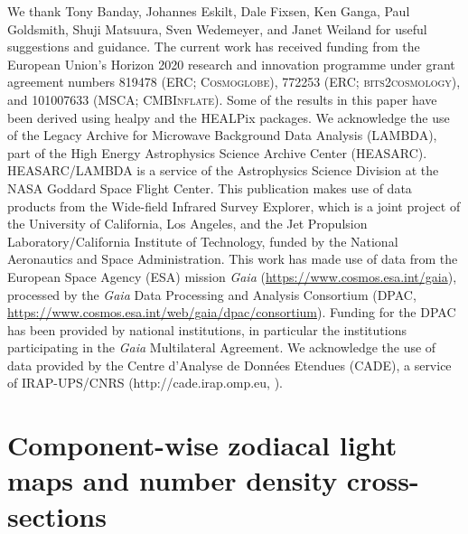 \documentclass[twocolumn]{aa}
\begin{document}
\begin{acknowledgements}
  We thank Tony Banday, Johannes Eskilt, Dale Fixsen, Ken Ganga, Paul
  Goldsmith, Shuji Matsuura, Sven Wedemeyer, and Janet Weiland for useful suggestions
  and guidance.  The current work has received funding from the
  European Union’s Horizon 2020 research and innovation programme
  under grant agreement numbers 819478 (ERC; \textsc{Cosmoglobe}),
  772253 (ERC; \textsc{bits2cosmology}), and 101007633 (MSCA;
  \textsc{CMBInflate}).  Some of the results in this paper have been
  derived using healpy \citep{Zonca2019} and the HEALPix
  \citep{healpix} packages.  We acknowledge the use of the Legacy
  Archive for Microwave Background Data Analysis (LAMBDA), part of the
  High Energy Astrophysics Science Archive Center
  (HEASARC). HEASARC/LAMBDA is a service of the Astrophysics Science
  Division at the NASA Goddard Space Flight Center. This publication
  makes use of data products from the Wide-field Infrared Survey
  Explorer, which is a joint project of the University of California,
  Los Angeles, and the Jet Propulsion Laboratory/California Institute
  of Technology, funded by the National Aeronautics and Space
  Administration. This work has made use of data from the European
  Space Agency (ESA) mission {\it Gaia}
  (\url{https://www.cosmos.esa.int/gaia}), processed by the {\it Gaia}
  Data Processing and Analysis Consortium (DPAC,
  \url{https://www.cosmos.esa.int/web/gaia/dpac/consortium}). Funding
  for the DPAC has been provided by national institutions, in
  particular the institutions participating in the {\it Gaia}
  Multilateral Agreement.
  We acknowledge the use of data provided by the Centre d'Analyse de Données Etendues (CADE), a service of IRAP-UPS/CNRS (http://cade.irap.omp.eu, \citealt{paradis:2012}). 
\end{acknowledgements}


%



%

\appendix
\onecolumn

\section{Component-wise zodiacal light maps and number density cross-sections}
\label{sec:zodi-comps}
\end{document}
